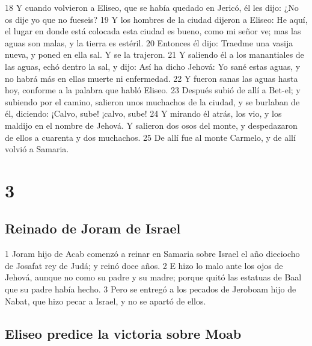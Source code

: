 18 Y cuando volvieron a Eliseo, que se había quedado en Jericó, él les dijo: ¿No os dije yo que no fueseis?
19 Y los hombres de la ciudad dijeron a Eliseo: He aquí, el lugar en donde está colocada esta ciudad es bueno, como mi señor ve; mas las aguas son malas, y la tierra es estéril.
20 Entonces él dijo: Traedme una vasija nueva, y poned en ella sal. Y se la trajeron.
21 Y saliendo él a los manantiales de las aguas, echó dentro la sal, y dijo: Así ha dicho Jehová: Yo sané estas aguas, y no habrá más en ellas muerte ni enfermedad.
22 Y fueron sanas las aguas hasta hoy, conforme a la palabra que habló Eliseo.
23 Después subió de allí a Bet-el; y subiendo por el camino, salieron unos muchachos de la ciudad, y se burlaban de él, diciendo: ¡Calvo, sube! ¡calvo, sube!
24 Y mirando él atrás, los vio, y los maldijo en el nombre de Jehová. Y salieron dos osos del monte, y despedazaron de ellos a cuarenta y dos muchachos.
25 De allí fue al monte Carmelo, y de allí volvió a Samaria.

\chapter{3}

\section*{Reinado de Joram de Israel}

1 Joram hijo de Acab comenzó a reinar en Samaria sobre Israel el año dieciocho de Josafat rey de Judá; y reinó doce años.
2 E hizo lo malo ante los ojos de Jehová, aunque no como su padre y su madre; porque quitó las estatuas de Baal que su padre había hecho.
3 Pero se entregó a los pecados de Jeroboam hijo de Nabat, que hizo pecar a Israel, y no se apartó de ellos.

\section*{Eliseo predice la victoria sobre Moab}

